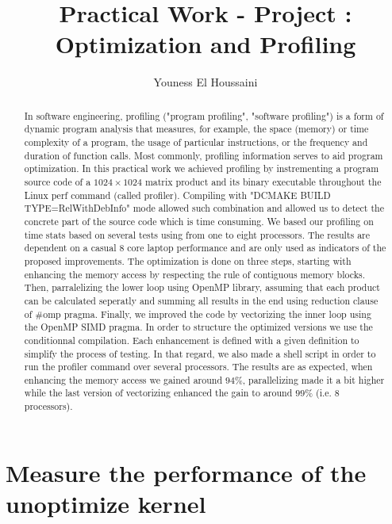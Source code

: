 \documentclass[a4paper, 10 pt, conference]{ieeeconf}
\title{\LARGE \bf
Practical Work - Project : Optimization and Profiling
}
\author{Youness El Houssaini}
\begin{document}
\maketitle
\thispagestyle{empty}
\pagestyle{empty}


\begin{abstract}

In software engineering, profiling ("program profiling", "software profiling") is a form of dynamic program analysis that measures, for example, the space (memory) or time complexity of a program, the usage of particular instructions, or the frequency and duration of function calls. Most commonly, profiling information serves to aid program optimization. In this practical work we achieved profiling by instrementing a program source code of a $1024\times1024$ matrix product and its binary executable throughout the Linux perf command (called profiler). Compiling with "DCMAKE BUILD TYPE=RelWithDebInfo" mode allowed such combination and allowed us to detect the concrete part of the source code which is time consuming. We based our profiling on time stats based on several tests using from one to eight processors. The results are dependent on a casual 8 core laptop performance and are only used as indicators of the proposed improvements. The optimization is done on three steps, starting with enhancing the memory access by respecting the rule of contiguous memory blocks. Then, parralelizing the lower loop using  OpenMP library, assuming that each product can be calculated seperatly and summing all results in the end using reduction clause of $\#$omp pragma. Finally, we improved the code by vectorizing the inner loop using the OpenMP SIMD pragma. In order to structure the optimized versions we use the conditionnal compilation. Each enhancement is defined with a given definition to simplify the process of testing. In that regard, we also made a shell script in order to run the profiler command over several processors. The results are as expected, when enhancing the memory access we gained around $94\%$, parallelizing made it a bit higher while the last version of vectorizing enhanced the gain to around $99\%$ (i.e. 8 processors).

\end{abstract}



\section{Measure the performance of the unoptimize kernel}
\end{document}
